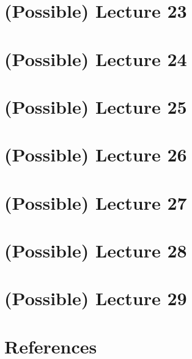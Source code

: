 \section{(Possible) Lecture 23}

\newpage

\section{(Possible) Lecture 24}

\newpage

\section{(Possible) Lecture 25}

\newpage

\section{(Possible) Lecture 26}

\newpage

\section{(Possible) Lecture 27}

\newpage

\section{(Possible) Lecture 28}

\newpage

\section{(Possible) Lecture 29}

\newpage

\section*{References}
\vspace{0.1in}

